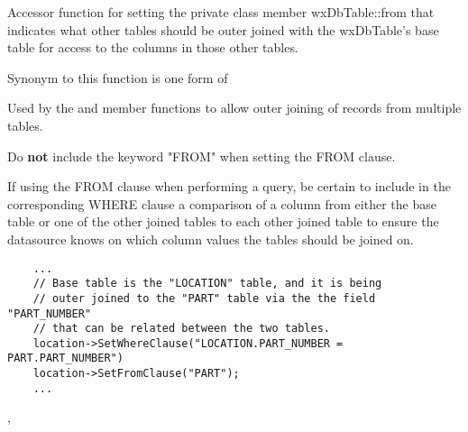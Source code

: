 Accessor function for setting the private class member wxDbTable::from
that indicates what other tables should be outer joined with the wxDbTable's
base table for access to the columns in those other tables.

Synonym to this function is one form of 




Used by the  and
 member functions to allow outer
joining of records from multiple tables.

Do {\bf not} include the keyword "FROM" when setting the FROM clause.

If using the FROM clause when performing a query, be certain to include in
the corresponding WHERE clause a comparison of a column from either the base
table or one of the other joined tables to each other joined table to ensure
the datasource knows on which column values the tables should be joined on.


\begin{verbatim}
    ...
    // Base table is the "LOCATION" table, and it is being
    // outer joined to the "PART" table via the the field "PART_NUMBER"
    // that can be related between the two tables.
    location->SetWhereClause("LOCATION.PART_NUMBER = PART.PART_NUMBER")
    location->SetFromClause("PART");
    ...
\end{verbatim}


,

\label{wxdbtablesetcolnull}



